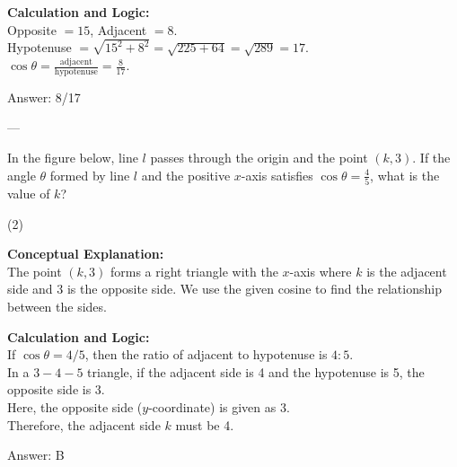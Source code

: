 \documentclass[11pt,paper=a4,answers]{exam}
\begin{document}
\begin{questions}
\begin{solution}
\vspace{10pt}
\textbf{Calculation and Logic:} \\
Opposite $= 15$, Adjacent $= 8$. \\
Hypotenuse $= \sqrt{15^2 + 8^2} = \sqrt{225 + 64} = \sqrt{289} = 17$. \\
$\cos \theta = \frac{\text{adjacent}}{\text{hypotenuse}} = \frac{8}{17}$.

\vspace{15pt}
Answer: \colorbox{yellow!100}{8/17}
\end{solution}

---

\question
In the figure below, line $l$ passes through the origin and the point $(k, 3)$. If the angle $\theta$ formed by line $l$ and the positive $x$-axis satisfies $\cos \theta = \frac{4}{5}$, what is the value of $k$?
\begin{center}
\end{center}
\begin{tasks}(2)
\end{tasks}

\begin{solution}
\textbf{Conceptual Explanation:} \\
The point $(k, 3)$ forms a right triangle with the $x$-axis where $k$ is the adjacent side and 3 is the opposite side. We use the given cosine to find the relationship between the sides.

\vspace{10pt}
\textbf{Calculation and Logic:} \\
If $\cos \theta = 4/5$, then the ratio of adjacent to hypotenuse is $4:5$. \\
In a $3-4-5$ triangle, if the adjacent side is 4 and the hypotenuse is 5, the opposite side is 3. \\
Here, the opposite side ($y$-coordinate) is given as 3. \\
Therefore, the adjacent side $k$ must be 4.

\vspace{15pt}
Answer: \colorbox{yellow!100}{B}
\end{solution}


\end{questions}
\end{document}
